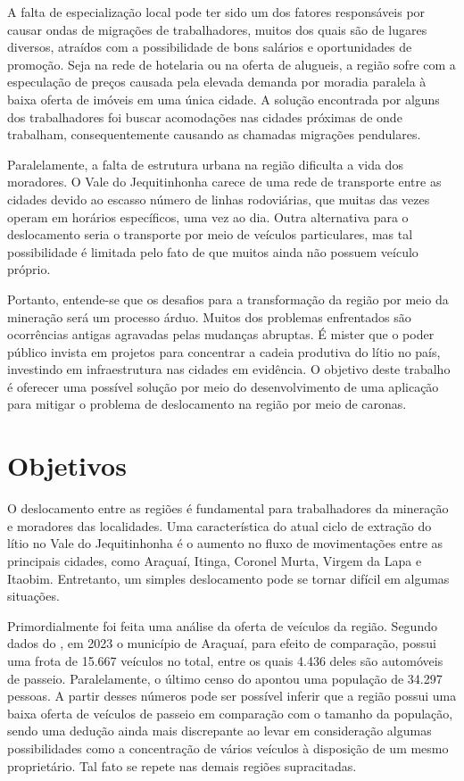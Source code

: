 A falta de especialização local pode ter sido um dos fatores responsáveis por causar ondas de migrações de trabalhadores, muitos dos quais são de lugares diversos, atraídos com a possibilidade de bons salários e oportunidades de promoção. Seja na rede de hotelaria ou na oferta de alugueis, a região sofre com a especulação de preços causada pela elevada demanda por moradia paralela à baixa oferta de imóveis em uma única cidade. A solução encontrada por alguns dos trabalhadores foi buscar acomodações nas cidades próximas de onde trabalham, consequentemente causando as chamadas migrações pendulares.

Paralelamente, a falta de estrutura urbana na região dificulta a vida dos moradores. O Vale do Jequitinhonha carece de uma rede de transporte entre as cidades devido ao escasso número de linhas rodoviárias, que muitas das vezes operam em horários específicos, uma vez ao dia. Outra alternativa para o deslocamento seria o transporte por meio de veículos particulares, mas tal possibilidade é limitada pelo fato de que muitos ainda não possuem veículo próprio.

Portanto, entende-se que os desafios para a transformação da região por meio da mineração será um processo árduo. Muitos dos problemas enfrentados são ocorrências antigas agravadas pelas mudanças abruptas. É mister que o poder público invista em projetos para concentrar a cadeia produtiva do lítio no país, investindo em infraestrutura nas cidades em evidência. O objetivo deste trabalho é oferecer uma possível solução por meio do desenvolvimento de uma aplicação para mitigar o problema de deslocamento na região por meio de caronas.


\section{Objetivos}

O deslocamento entre as regiões é fundamental para trabalhadores da mineração e moradores das localidades. Uma característica do atual ciclo de extração do lítio no Vale do Jequitinhonha é o aumento no fluxo de movimentações entre as principais cidades, como Araçuaí, Itinga, Coronel Murta, Virgem da Lapa e Itaobim. Entretanto, um simples deslocamento pode se tornar difícil em algumas situações.

Primordialmente foi feita uma análise da oferta de veículos da região. Segundo dados do , em 2023 o município de Araçuaí, para efeito de comparação, possui uma frota de 15.667 veículos no total, entre os quais 4.436 deles são automóveis de passeio. Paralelamente, o último censo do  apontou uma população de 34.297 pessoas. A partir desses números pode ser possível inferir que a região possui uma baixa oferta de veículos de passeio em comparação com o tamanho da população, sendo uma dedução ainda mais discrepante ao levar em consideração algumas possibilidades como a concentração de vários veículos à disposição de um mesmo proprietário. Tal fato se repete nas demais regiões supracitadas.

